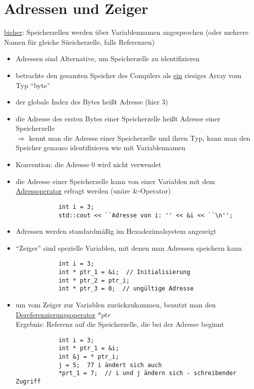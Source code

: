\documentclass{article}
\begin{document}
\section*{Adressen und Zeiger}
	\underline{bisher}: Speicherzellen werden über Variablennamen angesprochen (oder mehrere Namen für gleiche Süeicherzelle, falls Referenzen)
	\begin{itemize}
		\item Adressen sind Alternative, um Speicherzelle zu identifizieren
		\item betrachte den gesamten Speicher des Compilers als \underline{ein} riesiges Array vom Typ ``byte''  \\
		\item der globale Index des Bytes heißt Adresse (hier 3)
		\item die Adresse des ersten Bytes einer Speicherzelle heißt Adresse einer Speicherzelle \\
		$\Rightarrow $ kennt man die Adresse einer Speicherzelle und ihren Typ, kann man den Speicher genauso identifizieren wie mit Variablennamen
		\item Konvention: die Adresse 0 wird nicht verwendet
		\item die Adresse einer Speicherzelle kann von einer Variablen mit dem \underline{Adressoperator} erfragt werden (unäre \&-Operator)
		\begin{lstlisting}
			int i = 3;
			std::cout << ``Adresse von i: '' << &i << ``\n'';
		\end{lstlisting}
		\item Adressen werden standardmäßig im Hexadezimalsystem angezeigt
		\item ``Zeiger'' sind spezielle Variablen, mit denen man Adressen speichern kann
		\begin{lstlisting}
			int i = 3;
			int * ptr_1 = &i;  // Initialisierung
			int * ptr_2 = ptr_i;
			int * ptr_3 = 0;  // ungültige Adresse
		\end{lstlisting}
		\item um vom Zeiger zur Variablen zurückzukommen, benutzt man den \underline{Dereferenzierungsoperator} $*ptr$  \\
		Ergebnis: Referenz auf die Speicherzelle, die bei der Adresse beginnt
		\begin{lstlisting}
			int i = 3;
			int * ptr_1 = &i;
			int &j = * ptr_i;
			j = 5;  77 i ändert sich auch
			*prt_1 = 7;  // i und j ändern sich - schreibender Zugriff


\end{lstlisting}
\end{itemize}
\end{document}
